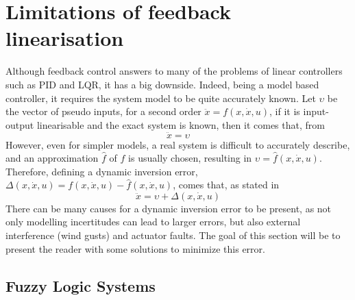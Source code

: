 \section{Limitations of feedback linearisation}
\label{section:background/limitations}
Although feedback control answers to many of the problems of linear controllers such as PID and LQR, it has a big downside. Indeed, being a model based controller, it requires the system model to be quite accurately known. Let $\upsilon$ be the vector of pseudo inputs, for a second order $\ddot{x} = f(x,\dot{x},u)$, if it is input-output linearisable and the exact system is known, then it comes that, from \cite{YANG+LIN_Adaptive_Flight_Control}
\begin{equation}
\ddot{x}=\upsilon
\end{equation}
However, even for simpler models, a real system is difficult to accurately describe, and an approximation $\hat{f}$ of $f$ is usually chosen, resulting in $\upsilon=\hat{f}(x,\dot{x},u)$. Therefore, defining a dynamic inversion error, $\Delta(x,\dot{x},u)=f(x,\dot{x},u)-\hat{f}(x,\dot{x},u)$, comes that, as stated in \cite{YANG+LIN_Adaptive_Flight_Control}
\begin{equation}
\ddot{x}=\upsilon + \Delta(x,\dot{x},u)
\label{eq:system+error}
\end{equation}
There can be many causes for a dynamic inversion error to be present, as not only modelling incertitudes can lead to larger errors, but also external interference (wind gusts) and actuator faults. The goal of this section will be to present the reader with some solutions to minimize this error. 

\subsection{Fuzzy Logic Systems}
\label{section:background/fuzzy_logic}

